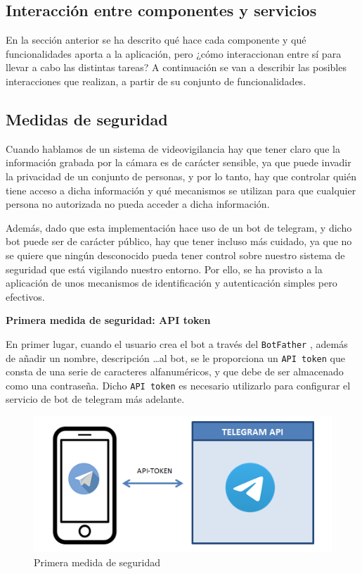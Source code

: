 \subsection{Interacción entre componentes y servicios}

En la sección anterior se ha descrito qué hace cada componente y qué funcionalidades aporta a la aplicación, pero ¿cómo interaccionan entre sí para llevar a cabo las distintas tareas? A continuación se van a describir las posibles interacciones que realizan, a partir de su conjunto de funcionalidades.



\subsection{Medidas de seguridad}

Cuando hablamos de un sistema de videovigilancia hay que tener claro que la información grabada por la cámara es de carácter sensible, ya que puede invadir la privacidad de un conjunto de personas, y por lo tanto, hay que controlar quién tiene acceso a dicha información y qué mecanismos se utilizan para que cualquier persona no autorizada no pueda acceder a dicha información.

Además, dado que esta implementación hace uso de un bot de telegram, y dicho bot puede ser de carácter público, hay que tener incluso más cuidado, ya que no se quiere que ningún desconocido pueda tener control sobre nuestro sistema de seguridad que está vigilando nuestro entorno. Por ello, se ha provisto a la aplicación de unos mecanismos de identificación y autenticación simples pero efectivos.

\textbf{Primera medida de seguridad: API token}

En primer lugar, cuando el usuario crea el bot a través del \texttt{BotFather} \cite{ref31}, además de añadir un nombre, descripción \ldots al bot, se le proporciona un \texttt{API token} que consta de una serie de caracteres alfanuméricos, y que debe de ser almacenado como una contraseña. Dicho \texttt{API token} es necesario utilizarlo para configurar el servicio de bot de telegram más adelante. 


\begin{figure}[h]
	\centering
	\includegraphics[scale=0.35]{images/36}
	\caption{Primera medida de seguridad}
	\label{img:seg1}
\end{figure}

